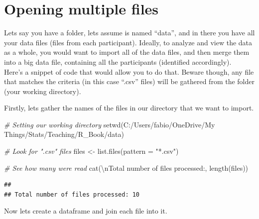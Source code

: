 \documentclass[
]{book}
\newenvironment{Shaded}{\begin{snugshade}}{\end{snugshade}}
\newcommand{\AttributeTok}[1]{\textcolor[rgb]{0.77,0.63,0.00}{#1}}
\newcommand{\CommentTok}[1]{\textcolor[rgb]{0.56,0.35,0.01}{\textit{#1}}}
\newcommand{\FunctionTok}[1]{\textcolor[rgb]{0.00,0.00,0.00}{#1}}
\newcommand{\NormalTok}[1]{#1}
\newcommand{\OtherTok}[1]{\textcolor[rgb]{0.56,0.35,0.01}{#1}}
\newcommand{\SpecialCharTok}[1]{\textcolor[rgb]{0.00,0.00,0.00}{#1}}
\newcommand{\StringTok}[1]{\textcolor[rgb]{0.31,0.60,0.02}{#1}}
\begin{document}
\hypertarget{opening-multiple-files}{%
\section{Opening multiple files}\label{opening-multiple-files}}

Lets say you have a folder, lets assume is named ``data'', and in there you have all your data files (files from each participant).
Ideally, to analyze and view the data as a whole, you would want to import all of the data files, and then merge them into a big data file, containing all the participants (identified accordingly).\\
Here's a snippet of code that would allow you to do that.
Beware though, any file that matches the criteria (in this case ``.csv'' files) will be gathered from the folder (your working directory).

Firstly, lets gather the names of the files in our directory that we want to import.

\begin{Shaded}
\begin{Highlighting}[]
\CommentTok{\# Setting our working directory}
\FunctionTok{setwd}\NormalTok{(}\StringTok{\textquotesingle{}C:/Users/fabio/OneDrive/My Things/Stats/Teaching/R\_Book/data\textquotesingle{}}\NormalTok{)}

\CommentTok{\# Look for ".csv" files}
\NormalTok{files }\OtherTok{\textless{}{-}} \FunctionTok{list.files}\NormalTok{(}\AttributeTok{pattern =} \StringTok{"*.csv"}\NormalTok{)}

\CommentTok{\# See how many were read}
\FunctionTok{cat}\NormalTok{(}\StringTok{\textquotesingle{}}\SpecialCharTok{\textbackslash{}n}\StringTok{Total number of files processed:\textquotesingle{}}\NormalTok{, }\FunctionTok{length}\NormalTok{(files))}
\end{Highlighting}
\end{Shaded}

\begin{verbatim}
## 
## Total number of files processed: 10
\end{verbatim}

Now lets create a dataframe and join each file into it.
\end{document}
